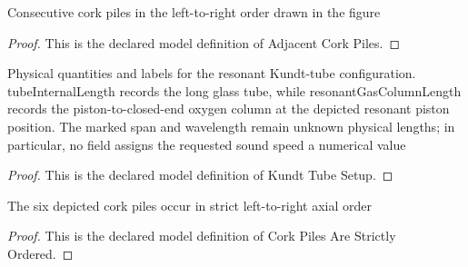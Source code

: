 \begin{definition}
  \label{def:physics:phyx-mini-0183:phyxminiproblems-problemphyxmini0183-adjacentcorkpiles}
  Consecutive cork piles in the left-to-right order drawn in the figure
\end{definition}
\begin{proof}
  This is the declared model definition of Adjacent Cork Piles.
\end{proof}
\begin{definition}
  \label{def:physics:phyx-mini-0183:phyxminiproblems-problemphyxmini0183-kundttubesetup}
  Physical quantities and labels for the resonant Kundt-tube configuration. tubeInternalLength records the long glass tube, while resonantGasColumnLength records the piston-to-closed-end oxygen column at the depicted resonant piston position. The marked span and wavelength remain unknown physical lengths; in particular, no field assigns the requested sound speed a numerical value
\end{definition}
\begin{proof}
  This is the declared model definition of Kundt Tube Setup.
\end{proof}
\begin{definition}
  \label{def:physics:phyx-mini-0183:phyxminiproblems-problemphyxmini0183-corkpilesarestrictlyordered}
  The six depicted cork piles occur in strict left-to-right axial order
\end{definition}
\begin{proof}
  This is the declared model definition of Cork Piles Are Strictly Ordered.
\end{proof}
